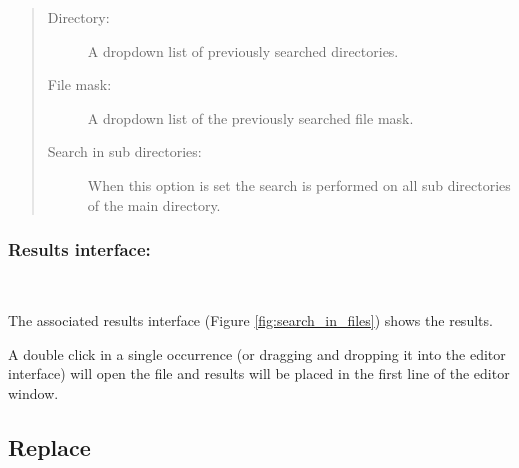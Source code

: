 \begin{quote}
  \begin{footnotesize}
    \begin{description}
      \item[Directory:]
        A dropdown list of previously searched directories.
      \item[File mask:]
        A dropdown list of the previously searched file mask.
      \item[Search in sub directories:]
        When this option is set the search is performed on all sub
        directories of the main directory.
    \end{description}
  \end{footnotesize}
\end{quote}

\subsubsection{Results interface:}\\

The associated results interface
(Figure \ref{fig:search_in_files})
shows the results.

A double click in a single occurrence (or dragging and dropping it into the
editor interface) will open the file and results will be placed in the first
line of the editor window.


\hypertarget{find_replace}{}
\subsection{Replace}

